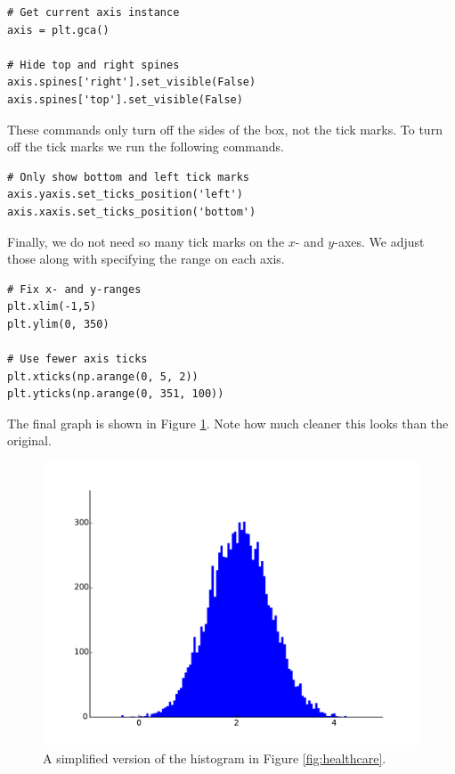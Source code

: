 \begin{lstlisting}
# Get current axis instance
axis = plt.gca()

# Hide top and right spines
axis.spines['right'].set_visible(False)
axis.spines['top'].set_visible(False)
\end{lstlisting}

These commands only turn off the sides of the box, not the tick marks. 
To turn off the tick marks we run the following commands. 

\begin{lstlisting}
# Only show bottom and left tick marks
axis.yaxis.set_ticks_position('left')
axis.xaxis.set_ticks_position('bottom')
\end{lstlisting}

Finally, we do not need so many tick marks on the $x$- and $y$-axes. 
We adjust those along with specifying the range on each axis.

\begin{lstlisting}
# Fix x- and y-ranges
plt.xlim(-1,5)
plt.ylim(0, 350)

# Use fewer axis ticks
plt.xticks(np.arange(0, 5, 2))
plt.yticks(np.arange(0, 351, 100))
\end{lstlisting}

The final graph is shown in Figure \ref{fig:simplify}. 
Note how much cleaner this looks than the original.

\begin{figure}
\centering
\includegraphics[width=\textwidth]{simplify.pdf}
\caption{A simplified version of the histogram in Figure \ref{fig:healthcare}.}
\label{fig:simplify}
\end{figure}


